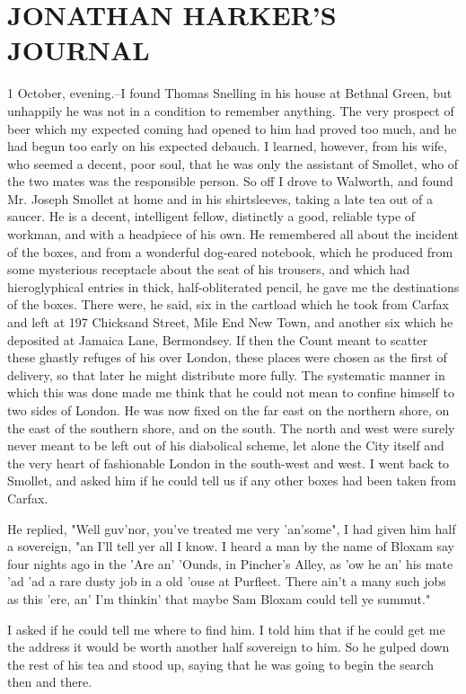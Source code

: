 \chapter{JONATHAN HARKER'S JOURNAL}

1 October, evening.--I found Thomas Snelling in his house at Bethnal Green, but unhappily he was not in a condition to remember anything. The very prospect of beer which my expected coming had opened to him had proved too much, and he had begun too early on his expected debauch. I learned, however, from his wife, who seemed a decent, poor soul, that he was only the assistant of Smollet, who of the two mates was the responsible person. So off I drove to Walworth, and found Mr. Joseph Smollet at home and in his shirtsleeves, taking a late tea out of a saucer. He is a decent, intelligent fellow, distinctly a good, reliable type of workman, and with a headpiece of his own. He remembered all about the incident of the boxes, and from a wonderful dog-eared notebook, which he produced from some mysterious receptacle about the seat of his trousers, and which had hieroglyphical entries in thick, half-obliterated pencil, he gave me the destinations of the boxes. There were, he said, six in the cartload which he took from Carfax and left at 197 Chicksand Street, Mile End New Town, and another six which he deposited at Jamaica Lane, Bermondsey. If then the Count meant to scatter these ghastly refuges of his over London, these places were chosen as the first of delivery, so that later he might distribute more fully. The systematic manner in which this was done made me think that he could not mean to confine himself to two sides of London. He was now fixed on the far east on the northern shore, on the east of the southern shore, and on the south. The north and west were surely never meant to be left out of his diabolical scheme, let alone the City itself and the very heart of fashionable London in the south-west and west. I went back to Smollet, and asked him if he could tell us if any other boxes had been taken from Carfax. 

He replied, "Well guv'nor, you've treated me very 'an'some", I had given him half a sovereign, "an I'll tell yer all I know. I heard a man by the name of Bloxam say four nights ago in the 'Are an' 'Ounds, in Pincher's Alley, as 'ow he an' his mate 'ad 'ad a rare dusty job in a old 'ouse at Purfleet. There ain't a many such jobs as this 'ere, an' I'm thinkin' that maybe Sam Bloxam could tell ye summut." 

I asked if he could tell me where to find him. I told him that if he could get me the address it would be worth another half sovereign to him. So he gulped down the rest of his tea and stood up, saying that he was going to begin the search then and there. 

